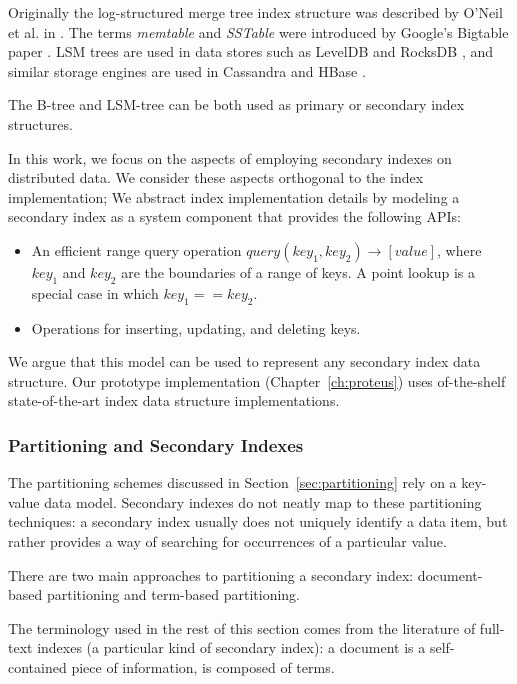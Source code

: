 Originally the log-structured merge tree index structure was described by O'Neil et al. in \cite{oneil:lsmtree}.
The terms \textit{memtable} and \textit{SSTable} were introduced by Google's Bigtable paper \cite{chang:bigtable}.
LSM trees are used in data stores such as LevelDB \cite{leveldb:implnotes} and RocksDB \cite{rocksdb:history},
and similar storage engines are used in Cassandra and HBase \cite{hbase:hfile}.

\bigskip
\noindent
The B-tree and LSM-tree can be both used as primary or secondary index structures.

In this work, we focus on the aspects of employing secondary indexes on distributed data.
We consider these aspects orthogonal to the index implementation;
We abstract index implementation details by modeling a secondary index as a system component that provides the following
APIs:
\begin{itemize}
  \item An efficient range query operation $query(key_1, key_2) \rightarrow [value]$,
  where $key_1$ and $key_2$ are the boundaries of a range of keys.
  A point lookup is a special case in which $key_1 == key_2$.

  \item Operations for inserting, updating, and deleting keys.
\end{itemize}

We argue that this model can be used to represent any secondary index data structure.
Our prototype implementation (Chapter~\ref{ch:proteus}) uses of-the-shelf state-of-the-art index data structure implementations.

\subsubsection{Partitioning and Secondary Indexes}
\label{sec:index_partitioning_background}
The partitioning schemes discussed in Section~\ref{sec:partitioning} rely on a key-value data model.
Secondary indexes do not neatly map to these partitioning techniques:
a secondary index usually does not uniquely identify a data item, but rather provides a way of searching for occurrences
of a particular value.

There are two main approaches to partitioning a secondary index:
document-based partitioning and term-based partitioning.

The terminology used in the rest of this section comes from the literature of full-text indexes
(a particular kind of secondary index):
a document is a self-contained piece of information, is composed of terms.

